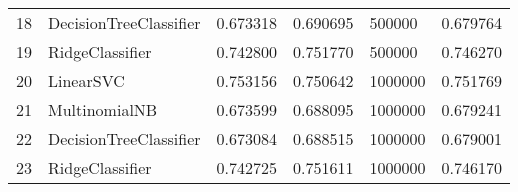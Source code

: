 \begin{longtable}{llrrlr}
18 &  DecisionTreeClassifier &  0.673318 &   0.690695 &       500000 &  0.679764 \\
19 &         RidgeClassifier &  0.742800 &   0.751770 &       500000 &  0.746270 \\
20 &               LinearSVC &  0.753156 &   0.750642 &      1000000 &  0.751769 \\
21 &           MultinomialNB &  0.673599 &   0.688095 &      1000000 &  0.679241 \\
22 &  DecisionTreeClassifier &  0.673084 &   0.688515 &      1000000 &  0.679001 \\
23 &         RidgeClassifier &  0.742725 &   0.751611 &      1000000 &  0.746170 \\
\bottomrule
\end{longtable}